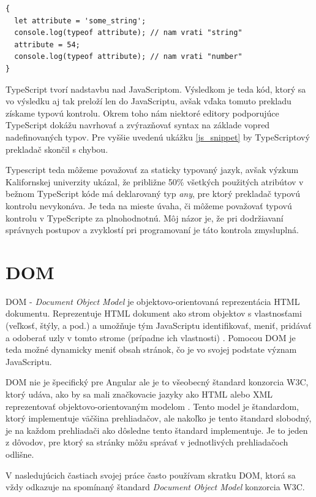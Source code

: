 \documentclass[
  digital, %
  twoside, %
  notable,   %
  nolof,   %
  nolot,   %
]{fithesis3}
\begin{document}
\begin{lstlisting}[caption={Kód v JavaScripte},captionpos=b,label=js_snippet]
{
  let attribute = 'some_string';
  console.log(typeof attribute); // nam vrati "string"
  attribute = 54;
  console.log(typeof attribute); // nam vrati "number"
}
\end{lstlisting}

TypeScript tvorí nadstavbu nad JavaScriptom. Výsledkom je teda kód, ktorý sa vo výsledku aj tak preloží len do JavaScriptu, avšak vďaka tomuto prekladu získame typovú kontrolu. Okrem toho nám niektoré editory podporujúce TypeScript dokážu navrhovať a zvýrazňovať syntax na základe vopred nadefinovaných typov. Pre vyššie uvedenú ukážku \ref{js_snippet} by TypeScriptový prekladač skončil s chybou.

Typescript teda môžeme považovať za staticky typovaný jazyk, avšak výzkum Kalifornskej univerzity\cite{ray2014large} ukázal, že približne 50\% všetkých použitých atribútov v bežnom TypeScript kóde má deklarovaný typ \textit{any}, pre ktorý prekladač typovú kontrolu nevykonáva. Je teda na mieste úvaha, či môžeme považovať typovú kontrolu v TypeScripte za plnohodnotnú. Môj názor je, že pri dodržiavaní správnych postupov a zvyklostí pri programovaní je táto kontrola zmysluplná.

\section{DOM}
DOM - \textit{Document Object Model} je objektovo-orientovaná reprezentácia HTML dokumentu. Reprezentuje HTML dokument ako strom objektov s vlastnosťami (veľkosť, štýly, a pod.) a umožňuje tým JavaScriptu identifikovať, meniť, pridávať a odoberať uzly v tomto strome (prípadne ich vlastnosti) \cite{yang2009topic}. Pomocou DOM je teda možné dynamicky meniť obsah stránok, čo je vo svojej podstate význam JavaScriptu.

DOM nie je špecifický pre Angular ale je to všeobecný štandard konzorcia W3C, ktorý udáva, ako by sa mali značkovacie jazyky ako HTML alebo XML reprezentovať objektovo-orientovaným modelom \cite{wood1999programming}. Tento model je štandardom, ktorý implementuje väčšina prehliadačov, ale nakoľko je tento štandard slobodný, je na každom prehliadači ako dôsledne tento štandard implementuje. Je to jeden z dôvodov, pre ktorý sa stránky môžu správať v jednotlivých prehliadačoch odlišne.

V nasledujúcich častiach svojej práce často používam skratku DOM, ktorá sa vždy odkazuje na spomínaný štandard \textit{Document Object Model} konzorcia W3C.
\end{document}
